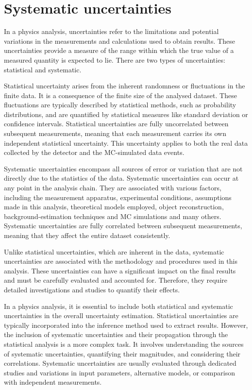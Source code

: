 \FloatBarrier
\section{Systematic uncertainties}
\label{sec:ChaptH:Systematics}
In a physics analysis, uncertainties refer to the limitations and potential variations in the measurements 
and calculations used to obtain results. These uncertainties provide a measure of the range within which 
the true value of a measured quantity is expected to lie. There are two types of uncertainties: 
statistical and systematic.

Statistical uncertainty arises from the inherent randomness or fluctuations in the finite data. It is a 
consequence of the finite size of the analysed dataset. These fluctuations are typically described by 
statistical methods, such as probability distributions, and are quantified by statistical measures like 
standard deviation or confidence intervals. Statistical uncertainties are fully uncorrelated between 
subsequent measurements, meaning that each measurement carries its own independent statistical 
uncertainty. This uncertainty applies to both the real data collected by the detector
and the MC-simulated data events.


Systematic uncertainties encompass all sources of error or variation that are not 
directly due to the statistics of the data. 
Systematic uncertainties can occur at any point in the analysis chain.
They are associated with various factors, including the measurement apparatus, 
experimental conditions, assumptions made in this analysis, theoretical models employed, object reconstruction, background-estimation techniques and MC 
simulations and many others. Systematic uncertainties are fully correlated between subsequent 
measurements, meaning that they affect the entire dataset consistently.

Unlike statistical uncertainties, which are inherent in the data, systematic uncertainties are associated 
with the methodology and procedures used in this analysis. These uncertainties can have a significant 
impact on the final results and must be carefully evaluated and accounted for. Therefore, they require 
detailed investigations and studies to quantify their effects.

In a physics analysis, it is essential to include both statistical and systematic uncertainties in the overall 
uncertainty estimation. Statistical uncertainties are typically incorporated into the inference method used 
to extract results. However, the inclusion of systematic uncertainties and their propagation through the 
statistical analysis is a more complex task. It involves understanding the sources of systematic 
uncertainties, quantifying their magnitudes, and considering their correlations. Systematic uncertainties 
are usually evaluated through dedicated studies and variations in input parameters, alternative models, 
or comparison with independent measurements.

